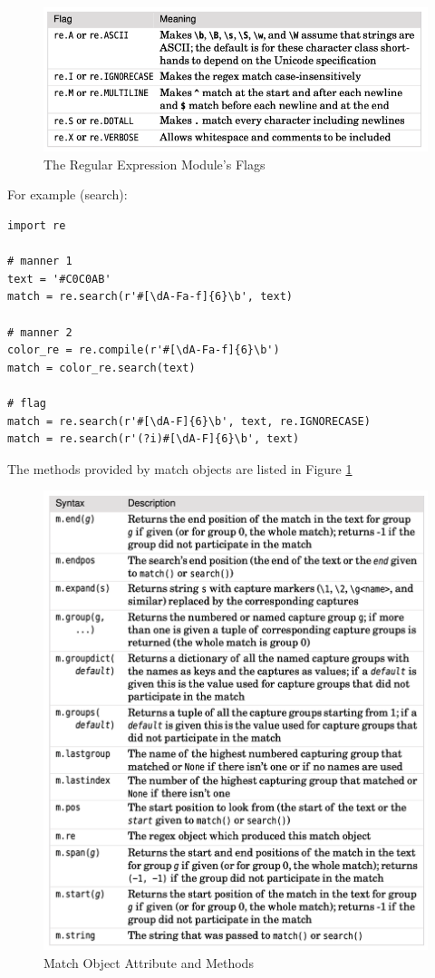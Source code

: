 \begin{figure}[!ht]
  \centering
  \includegraphics[width=\textwidth]{pics/regex-flag}
  \caption{The Regular Expression Module's Flags}
\end{figure}


For example (search):
\begin{lstlisting}
import re

# manner 1
text = '#C0C0AB'
match = re.search(r'#[\dA-Fa-f]{6}\b', text)

# manner 2
color_re = re.compile(r'#[\dA-Fa-f]{6}\b')
match = color_re.search(text)

# flag
match = re.search(r'#[\dA-F]{6}\b', text, re.IGNORECASE)
match = re.search(r'(?i)#[\dA-F]{6}\b', text)
\end{lstlisting}


The methods provided by match objects are listed in Figure \ref{fig:match-object-methods}
\begin{figure}[!ht]
  \centering
  \includegraphics[width=\textwidth]{pics/match-object-methods}
  \caption{Match Object Attribute and Methods}
  \label{fig:match-object-methods}
\end{figure}

